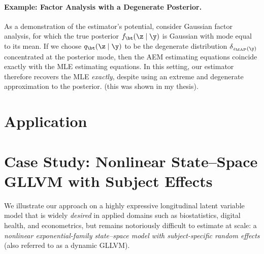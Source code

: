 \paragraph{Example: Factor Analysis with a Degenerate Posterior.}
As a demonstration of the estimator's potential, consider Gaussian factor analysis,
for which the true posterior $f_\bt(\z \mid \y)$ is Gaussian with mode equal to its mean.
If we choose $q_\bt(\z \mid \y)$ to be the degenerate distribution 
$\delta_{z_{\mathrm{MAP}}(\y)}$ concentrated at the posterior mode, then the AEM 
estimating equations coincide exactly with the MLE estimating equations. 
In this setting, our estimator therefore recovers the MLE \emph{exactly}, 
despite using an extreme and degenerate approximation to the posterior. (this was shown in my thesis).


\section{Application}


\section{Case Study: Nonlinear State--Space GLLVM with Subject Effects}
\label{sec:case-dgllvm}

We illustrate our approach on a highly expressive longitudinal latent variable model 
that is widely \emph{desired} in applied domains such as biostatistics, digital health, 
and econometrics, but remains notoriously difficult to estimate at scale: 
a \emph{nonlinear exponential-family state--space model with subject-specific random effects} 
(also referred to as a dynamic GLLVM).

